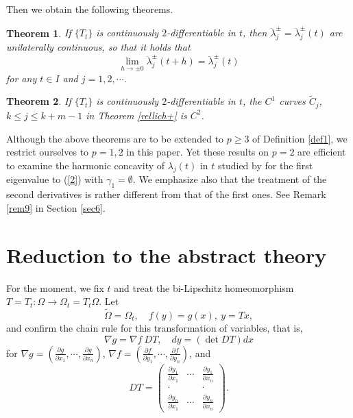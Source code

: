 \documentclass[final,a4paper]{jmsj}
\theoremstyle{thmstyleone}%
\newtheorem{theorem}{Theorem}
\theoremstyle{thmstyletwo}%
\theoremstyle{thmstylethree}%
\begin{document}
 Then we obtain the following theorems. 

\begin{theorem}\label{secondconti}
If $\{ T_{t}\}$ is continuously $2$-differentiable in $t$, then $\ddot\lambda_j^\pm=\ddot \lambda_j^\pm(t)$ are unilaterally continuous, so that it holds that 
\[ \lim_{h\rightarrow \pm 0}\ddot \lambda_j^\pm(t+h)=\ddot \lambda_j^\pm(t) \] 
for any $t\in I$ and $j=1,2,\cdots$. 
\end{theorem} 




\begin{theorem}\label{c2theorem} 
If $\{ T_t\}$ is continuously $2$-differentiable in $t$, the $C^1$ curves $\tilde C_j$, $k\leq j\leq k+m-1$ in Theorem \ref{rellich+} is $C^2$. 
\end{theorem} 



Although the above theorems are to be extended to $p\geq 3$ of Definition \ref{def1}, we restrict ourselves to $p=1,2$ in this paper. Yet these results on $p=2$ are efficient to examine the harmonic concavity of $\lambda_j(t)$ in $t$ studied by \cite{gs52} for the first eigenvalue to (\ref{2}) with $\gamma_1=\emptyset$. We emphasize also that the treatment of the second derivatives is rather different from that of the first ones. See Remark \ref{rem9} in Section \ref{sec6}. 





\section{Reduction to the abstract theory}\label{sec2}

 For the moment, we fix $t$ and treat the bi-Lipschitz homeomorphism $T=T_t:\Omega \rightarrow \Omega_t=T_t \Omega$. Let 
\[ \tilde \Omega=\Omega_t, \quad f(y)=g(x), \ y=Tx, \] 
and confirm the chain rule for this transformation of variables, that is,  
\[ \nabla g=\nabla f \ DT, \quad dy=(\det DT)dx \] 
for $\nabla g=(\frac{\partial g}{\partial x_1}, \cdots, \frac{\partial g}{\partial x_n})$, $\nabla f=(\frac{\partial f}{\partial y_1}, \cdots, \frac{\partial f}{\partial y_n})$, and 
\[ DT=\left( \begin{array}{ccc}
\frac{\partial y_1}{\partial x_1} & \cdots & \frac{\partial y_1}{\partial x_n} \\ 
\cdot & & \cdot \\ 
\frac{\partial y_n}{\partial x_1} & \cdots& \frac{\partial y_n}{\partial x_n} \end{array} \right). \] 
\end{document}
